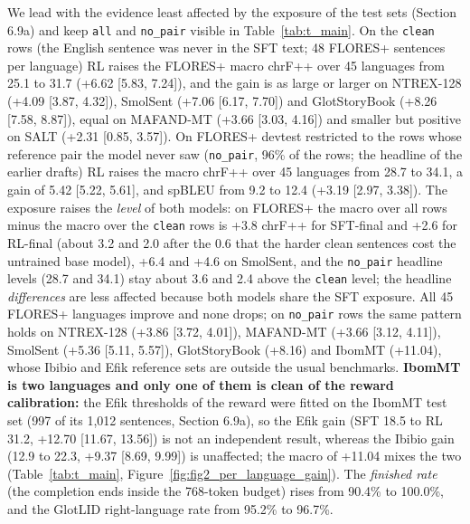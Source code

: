 We lead with the evidence least affected by the exposure of the test sets (Section 6.9a) and keep \texttt{all} and \texttt{no\_pair} visible in Table~\ref{tab:t_main}. On the \texttt{clean} rows (the English sentence was never in the SFT text; 48 FLORES+ sentences per language) RL raises the FLORES+ macro chrF++ over 45 languages from 25.1 to 31.7 (+6.62 {[}5.83, 7.24{]}), and the gain is as large or larger on NTREX-128 (+4.09 {[}3.87, 4.32{]}), SmolSent (+7.06 {[}6.17, 7.70{]}) and GlotStoryBook (+8.26 {[}7.58, 8.87{]}), equal on MAFAND-MT (+3.66 {[}3.03, 4.16{]}) and smaller but positive on SALT (+2.31 {[}0.85, 3.57{]}). On FLORES+ devtest restricted to the rows whose reference pair the model never saw (\texttt{no\_pair}, 96\% of the rows; the headline of the earlier drafts) RL raises the macro chrF++ over 45 languages from 28.7 to 34.1, a gain of 5.42 {[}5.22, 5.61{]}, and spBLEU from 9.2 to 12.4 (+3.19 {[}2.97, 3.38{]}). The exposure raises the \emph{level} of both models: on FLORES+ the macro over all rows minus the macro over the \texttt{clean} rows is +3.8 chrF++ for SFT-final and +2.6 for RL-final (about 3.2 and 2.0 after the 0.6 that the harder clean sentences cost the untrained base model), +6.4 and +4.6 on SmolSent, and the \texttt{no\_pair} headline levels (28.7 and 34.1) stay about 3.6 and 2.4 above the \texttt{clean} level; the headline \emph{differences} are less affected because both models share the SFT exposure. All 45 FLORES+ languages improve and none drops; on \texttt{no\_pair} rows the same pattern holds on NTREX-128 (+3.86 {[}3.72, 4.01{]}), MAFAND-MT (+3.66 {[}3.12, 4.11{]}), SmolSent (+5.36 {[}5.11, 5.57{]}), GlotStoryBook (+8.16) and IbomMT (+11.04), whose Ibibio and Efik reference sets are outside the usual benchmarks. \textbf{IbomMT is two languages and only one of them is clean of the reward calibration:} the Efik thresholds of the reward were fitted on the IbomMT test set (997 of its 1,012 sentences, Section 6.9a), so the Efik gain (SFT 18.5 to RL 31.2, +12.70 {[}11.67, 13.56{]}) is not an independent result, whereas the Ibibio gain (12.9 to 22.3, +9.37 {[}8.69, 9.99{]}) is unaffected; the macro of +11.04 mixes the two (Table~\ref{tab:t_main}, Figure~\ref{fig:fig2_per_language_gain}). The \emph{finished rate} (the completion ends inside the 768-token budget) rises from 90.4\% to 100.0\%, and the GlotLID right-language rate from 95.2\% to 96.7\%.

